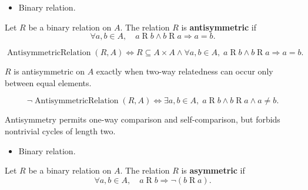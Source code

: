 \begin{remark*}[Dependencies]
\begin{itemize}
  \item Binary relation.
\end{itemize}
\end{remark*}

\begin{definition}
\label{def:rel-antisymmetric}
Let $R$ be a binary relation on $A$.
The relation $R$ is \textbf{antisymmetric} if
\[
\forall a,b \in A,\quad
a \mathrel{R} b \land b \mathrel{R} a \Rightarrow a=b.
\]
\end{definition}

\begin{remark*}
\[
\operatorname{AntisymmetricRelation}(R,A)
\Longleftrightarrow
R\subseteq A\times A
\land
\forall a,b\in A,\;
a\mathrel{R}b \land b\mathrel{R}a \Rightarrow a=b.
\]
\end{remark*}

\begin{remark*}
$R$ is antisymmetric on $A$ exactly when two-way relatedness can occur only
between equal elements.
\end{remark*}

\begin{remark*}
\[
\neg\operatorname{AntisymmetricRelation}(R,A)
\Longleftrightarrow
\exists a,b\in A,\;
a\mathrel{R}b \land b\mathrel{R}a \land a\neq b.
\]
\end{remark*}

\begin{remark*}[Interpretation]
Antisymmetry permits one-way comparison and self-comparison, but forbids
nontrivial cycles of length two.
\end{remark*}

\begin{remark*}[Dependencies]
\begin{itemize}
  \item Binary relation.
\end{itemize}
\end{remark*}

\begin{definition}
\label{def:rel-asymmetric}
Let $R$ be a binary relation on $A$.
The relation $R$ is \textbf{asymmetric} if
\[
\forall a,b \in A,\quad
a \mathrel{R} b \Rightarrow \lnot(b \mathrel{R} a).
\]
\end{definition}


